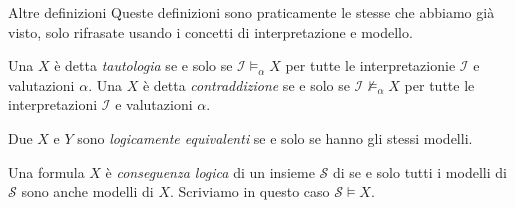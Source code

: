 \documentclass[aspectratio=169,10pt,dvipsnames,xcolor=table,handout]{beamer}
\newcommand{\mcI}{\mathcal{I}}
\begin{document}
\begin{frame}{Altre definizioni}
    Queste definizioni sono praticamente le stesse che abbiamo già visto, solo rifrasate usando i concetti di interpretazione e modello.

    \begin{definition}
        Una \fbf $X$ è detta \emph{tautologia} se e solo se $\mcI \models_\alpha X$ per tutte le interpretazionie $\mcI$ e valutazioni $\alpha$. Una \fbf $X$ è detta \emph{contraddizione} se e solo se $\mcI \not\models_\alpha X$ per tutte le interpretazioni $\mcI$ e valutazioni $\alpha$.
    \end{definition}

    \begin{definition}
        Due \fbf $X$ e $Y$ sono \emph{logicamente equivalenti} se e solo se hanno gli stessi modelli.
    \end{definition}

    \begin{definition}
        Una formula \fbf $X$ è \emph{conseguenza logica} di un insieme $\mathcal{S}$ di \fbf se e solo tutti i modelli di $\mathcal{S}$ sono anche modelli di $X$. Scriviamo in questo caso \textbf{$\mathcal S \models X$}.
    \end{definition}
\end{frame}
\end{document}
